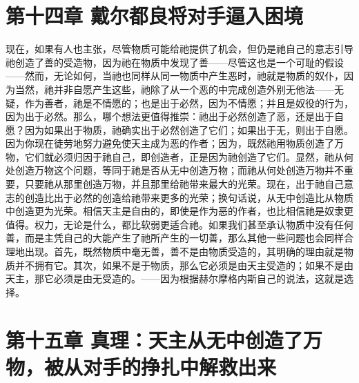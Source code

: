 
\section{第十四章 戴尔都良将对手逼入困境}

现在，如果有人也主张，尽管物质可能给祂提供了机会，但仍是祂自己的意志引导祂创造了善的受造物，因为祂在物质中发现了善——尽管这也是一个可耻的假设——然而，无论如何，当祂也同样从同一物质中产生恶时，祂就是物质的奴仆，因为当然，祂并非自愿产生这些，祂除了从一个恶的中完成创造外别无他法——无疑，作为善者，祂是不情愿的；也是出于必然，因为不情愿；并且是奴役的行为，因为出于必然。那么，哪个想法更值得推崇：祂出于必然创造了恶，还是出于自愿？因为如果出于物质，祂确实出于必然创造了它们；如果出于无，则出于自愿。因为你现在徒劳地努力避免使天主成为恶的作者；因为，既然祂用物质创造了万物，它们就必须归因于祂自己，即创造者，正是因为祂创造了它们。显然，祂从何处创造万物这个问题，等同于祂是否从无中创造万物；而祂从何处创造万物并不重要，只要祂从那里创造万物，并且那里给祂带来最大的光荣。现在，出于祂自己意志的创造比出于必然的创造给祂带来更多的光荣；换句话说，从无中创造比从物质中创造更为光荣。相信天主是自由的，即使是作为恶的作者，也比相信祂是奴隶更值得。权力，无论是什么，都比软弱更适合祂。如果我们甚至承认物质中没有任何善，而是主凭自己的大能产生了祂所产生的一切善，那么其他一些问题也会同样合理地出现。首先，既然物质中毫无善，善不是由物质受造的，其明确的理由就是物质并不拥有它。其次，如果不是于物质，那么它必须是由天主受造的；如果不是由天主，那它必须是由无受造的。——因为根据赫尔摩格内斯自己的说法，这就是选择。\par


\section{第十五章 真理：天主从无中创造了万物，被从对手的挣扎中解救出来}

